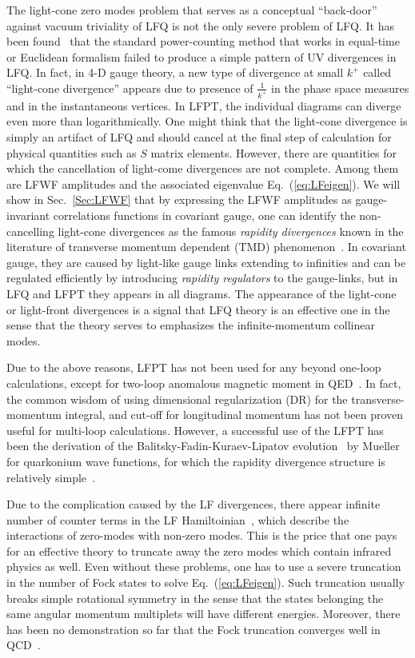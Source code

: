 \documentclass[twocolumn,superscriptaddress,longbibliography,10pt]{revtex4-1}
\begin{document}
The light-cone zero modes problem that serves as a conceptual ``back-door'' against vacuum triviality of LFQ is not the only severe problem of LFQ. It has been found~\cite{Wilson:1994fk} that the standard power-counting method that works in equal-time or Euclidean formalism failed to produce a simple pattern of UV divergences in LFQ.
In fact, in 4-D gauge theory, a new type of divergence at small $k^+$ called ``light-cone divergence'' appears due to presence of $\frac{1}{k^+}$ in the phase space measures and in the instantaneous vertices. In LFPT, the individual diagrams can diverge even more than logarithmically.  One might think that the light-cone divergence is simply an artifact of LFQ and should cancel at the final step of calculation for physical quantities such as $S$ matrix elements. However, there are quantities for which the cancellation of light-come divergences are not complete. Among them are LFWF amplitudes
and the associated eigenvalue Eq.~(\ref{eq:LFeigen}). We will show in Sec.~\ref{Sec:LFWF} that by expressing the LFWF amplitudes as gauge-invariant correlations functions in covariant gauge, one can identify the non-cancelling light-cone divergences as the famous {\it rapidity divergences}  known in the literature of transverse momentum dependent (TMD) phenomenon~\cite{Collins:2011zzd,Vladimirov:2016qkd,Vladimirov:2017ksc}. In covariant gauge, they are caused by light-like gauge links extending to infinities and can be regulated efficiently by introducing {\it rapidity regulators} to the gauge-links, but in LFQ and LFPT they appears in all diagrams.
The appearance of the light-cone or light-front divergences is a signal that LFQ theory is an effective one
in the sense that the theory serves to emphasizes the infinite-momentum collinear modes.

Due to the above reasons, LFPT has not been used
for any beyond one-loop calculations, except for two-loop anomalous magnetic
moment in QED~\cite{Langnau:1992zj}. In fact, the common wisdom of using dimensional regularization (DR) for the transverse-momentum integral, and cut-off for longitudinal momentum has not been proven useful for multi-loop calculations. However, a successful use of the LFPT has been the derivation of the Balitsky-Fadin-Kuraev-Lipatov evolution~\cite{Kuraev:1976ge,Balitsky:1978ic,Lipatov:1985uk} by Mueller for quarkonium wave functions, for which the rapidity divergence structure is relatively simple~\cite{Mueller:1993rr}.

Due to the complication caused by the LF divergences,  there appear infinite number of counter terms in the LF Hamiltoinian~\cite{Wilson:1994fk},
which describe the interactions of zero-modes with non-zero modes. This is the price that one pays for an effective theory to truncate away the zero modes which contain infrared physics as well. Even without these problems,
one has to use a severe truncation in the number of Fock states to solve  Eq.~(\ref{eq:LFeigen}).
Such truncation usually breaks simple rotational symmetry in the sense that the  states belonging the same angular momentum multiplets will have different energies. Moreover, there has been no demonstration so far that the Fock truncation converges well in QCD~\cite{Wilson:1994fk}.
\end{document}
